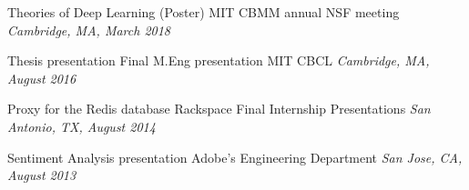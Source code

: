 \documentclass{article}
\newenvironment{changemargin}[2]{%
  \begin{list}{}{%
    \setlength{\topsep}{0pt}%
    \setlength{\leftmargin}{#1}%
    \setlength{\rightmargin}{#2}%
    \setlength{\listparindent}{\parindent}%
    \setlength{\itemindent}{\parindent}%
    \setlength{\parsep}{\parskip}%
  }%
  \item[]}{\end{list}
}
\newenvironment{body} {
	\vspace*{-16pt}
	\begin{changemargin}{-0.25in}{-0.5in}
  }	
	{\end{changemargin}
}
\begin{document}
\begin{body}
	\vspace{5 pt}
    Theories of Deep Learning (Poster)
    \hfill
    MIT CBMM annual NSF meeting
	\hfill %
	\emph{Cambridge, MA, March 2018}\\
	\vspace*{-3pt}
	
	
	\vspace{5 pt}
    Thesis presentation
    \hfill
    Final M.Eng presentation MIT CBCL
	\hfill %
	\emph{Cambridge, MA, August 2016}\\
	\vspace*{-3pt}
	
	\vspace{5 pt}
    Proxy for the Redis database
    \hfill
    Rackspace Final Internship Presentations
	\hfill %
	\emph{San Antonio, TX, August 2014}\\
	\vspace*{-3pt}

	\vspace{5 pt}
    Sentiment Analysis presentation
    \hfill
    Adobe’s Engineering Department
	\hfill %
	\emph{San Jose, CA, August 2013}\\
	\vspace*{-3pt}
    
    
\end{body}

\end{document}
